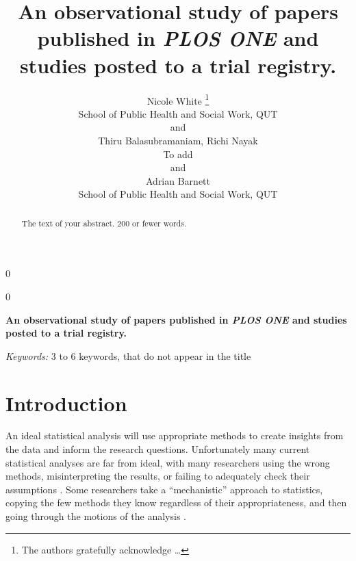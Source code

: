 \documentclass[12pt]{article}
\newcommand{\blind}{0}
\begin{document}
\def\spacingset#1{\renewcommand{\baselinestretch}%
{#1}\small\normalsize} \spacingset{1}



\blind
{
  \title{\bf An observational study of papers published in \emph{PLOS ONE} and
studies posted to a trial registry.}

  \author{
        Nicole White \thanks{The authors gratefully acknowledge \ldots{}} \\
    School of Public Health and Social Work, QUT\\
     and \\     Thiru Balasubramaniam, Richi Nayak \\
    To add\\
     and \\     Adrian Barnett \\
    School of Public Health and Social Work, QUT\\
      }
  \maketitle
} \fi

\blind
{
  \bigskip
  \bigskip
  \bigskip
  \begin{center}
    {\LARGE\bf An observational study of papers published in \emph{PLOS ONE} and
studies posted to a trial registry.}
  \end{center}
  \medskip
} \fi

\bigskip
\begin{abstract}
The text of your abstract. 200 or fewer words.
\end{abstract}

\noindent%
{\it Keywords:} 3 to 6 keywords, that do not appear in the title
\vfill

\newpage
\spacingset{1.45} %

\hypertarget{introduction}{%
\section{Introduction}\label{introduction}}

An ideal statistical analysis will use appropriate methods to create
insights from the data and inform the research questions. Unfortunately
many current statistical analyses are far from ideal, with many
researchers using the wrong methods, misinterpreting the results, or
failing to adequately check their assumptions \citep{2008, Leek2017}.
Some researchers take a ``mechanistic'' approach to statistics, copying
the few methods they know regardless of their appropriateness, and then
going through the motions of the analysis \citep{Stark2018}.
\end{document}
